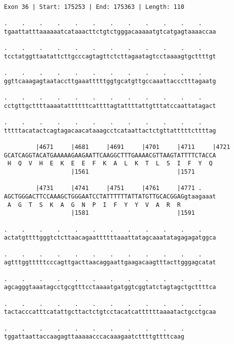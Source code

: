 \documentclass{article}
\begin{document}
\newpage
\begin{Verbatim}[fontfamily=courier]
Exon 36 | Start: 175253 | End: 175363 | Length: 110

.    .    .    .    .    .    .    .    .    .    .    .    
tgaattatttaaaaaatcataaacttctgtctgggacaaaaatgtcatgagtaaaaccaa

.    .    .    .    .    .    .    .    .    .    .    .    
tcctatggttaatattcttgcccagtagttctcttagaatagtcctaaaagtgcttttgt

.    .    .    .    .    .    .    .    .    .    .    .    
ggttcaaagagtaataccttgaaatttttggtgcatgttgccaaattaccctttagaatg

.    .    .    .    .    .    .    .    .    .    .    .    
cctgttgcttttaaaatattttttcattttagtattttattgtttatccaattatagact

.    .    .    .    .    .    .    .    .    .    .    .    
tttttacatactcagtagacaacataaagcctcataattactctgttatttttcttttag

         |4671     |4681     |4691     |4701     |4711     |4721
GCATCAGGTACATGAAAAAGAAGAATTCAAGGCTTTGAAAACGTTAAGTATTTTCTACCA
 H  Q  V  H  E  K  E  E  F  K  A  L  K  T  L  S  I  F  Y  Q 
                   |1561                         |1571      

         |4731     |4741     |4751     |4761     |4771 .    
AGCTGGGACTTCCAAAGCTGGGAATCCTATTTTTTATTATGTTGCACGGAGgtaagaaat
 A  G  T  S  K  A  G  N  P  I  F  Y  Y  V  A  R  R          
                   |1581                         |1591      

.    .    .    .    .    .    .    .    .    .    .    .    
actatgttttgggtctcttaacagaattttttaaattatagcaaatatagagagatggca

.    .    .    .    .    .    .    .    .    .    .    .    
agtttggtttttcccagttgacttaacaggaattgaagacaagtttacttgggagcatat

.    .    .    .    .    .    .    .    .    .    .    .    
agcagggtaaatagcctgcgtttcctaaaatgatggtcggtatctagtagctgcttttca

.    .    .    .    .    .    .    .    .    .    .    .    
tactacccatttcatattgcttactctgtcctacatcattttttaaaatactgcctgcaa

.    .    .    .    .    .    .    .    .    .    .
tggattaattaccaagagttaaaaacccacaaagaatcttttgttttcaag
\end{Verbatim}
\newpage
\end{document}
